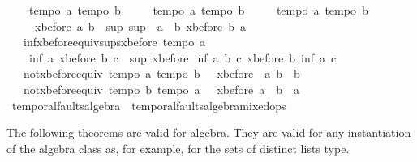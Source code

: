 \begin{isabellebody}
\ \ \ \ {\isasymlbrakk}tempo{}\ a{\isacharsemicolon}\ tempo{}\ b{\isasymrbrakk}\ {\isasymLongrightarrow}\isanewline
\ \ \ \ {\isasymlbrakk}tempo{}\ a{\isacharsemicolon}\ tempo{}\ b{\isasymrbrakk}\ {\isasymLongrightarrow}\isanewline
\ \ \ \ {\isasymlbrakk}tempo{}\ a{\isacharsemicolon}\ tempo{}\ b{\isasymrbrakk}\ {\isasymLongrightarrow}\isanewline
\ \ \ \ {\isacharminus}\ {\isacharparenleft}xbefore\ a\ b{\isacharparenright}\ {\isacharequal}\ sup\ {\isacharparenleft}sup\ {\isacharparenleft}{\isacharminus}\ a{\isacharparenright}\ {\isacharparenleft}{\isacharminus}\ b{\isacharparenright}{\isacharparenright}\ {\isacharparenleft}xbefore\ b\ a{\isacharparenright}{\isachardoublequoteclose}\isanewline
\ \ \ inf{\isacharunderscore}xbefore{\isacharunderscore}equiv{\isacharunderscore}sups{\isacharunderscore}xbefore{\isacharcolon}\ {\isachardoublequoteopen}tempo{}\ a\ {\isasymLongrightarrow}\ \isanewline
\ \ \ \ inf\ a\ {\isacharparenleft}xbefore\ b\ c{\isacharparenright}\ {\isacharequal}\ sup\ {\isacharparenleft}xbefore\ {\isacharparenleft}inf\ a\ b{\isacharparenright}\ c{\isacharparenright}\ {\isacharparenleft}xbefore\ b\ {\isacharparenleft}inf\ a\ c{\isacharparenright}{\isacharparenright}{\isachardoublequoteclose}\isanewline
\ \ \ not{\isacharunderscore}{}{\isacharunderscore}xbefore{\isacharunderscore}equiv{\isacharcolon}\ {\isachardoublequoteopen}{\isasymlbrakk}tempo{}\ a{\isacharsemicolon}\ tempo{}\ b\ {\isasymrbrakk}\ {\isasymLongrightarrow}\ xbefore\ {\isacharparenleft}{\isacharminus}\ a{\isacharparenright}\ b\ {\isacharequal}\ b{\isachardoublequoteclose}\isanewline
\ \ \ not{\isacharunderscore}{}{\isacharunderscore}xbefore{\isacharunderscore}equiv{\isacharcolon}\ {\isachardoublequoteopen}{\isasymlbrakk}tempo{}\ b{\isacharsemicolon}\ tempo{}\ a\ {\isasymrbrakk}\ {\isasymLongrightarrow}\ xbefore\ a\ {\isacharparenleft}{\isacharminus}\ b{\isacharparenright}\ {\isacharequal}\ a{\isachardoublequoteclose}\isanewline
\isanewline
{}\isamarkupfalse%
\ temporal{\isacharunderscore}faults{\isacharunderscore}algebra\ {\isacharequal}\ temporal{\isacharunderscore}faults{\isacharunderscore}algebra{\isacharunderscore}mixed{\isacharunderscore}ops%
\isamarkuptrue%
%
\begin{isamarkuptext}%
The following theorems are valid for \ac{algebra}.
They are valid for any instantiation of the \ac{algebra} class as, for example, for the sets of distinct lists type.%

\end{isamarkuptext}
\end{isabellebody}
